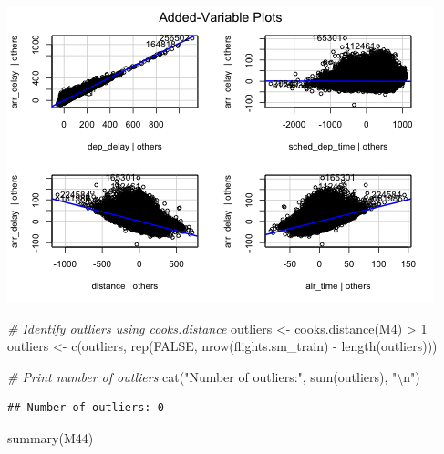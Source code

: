 \documentclass[
]{article}
\newenvironment{Shaded}{\begin{snugshade}}{\end{snugshade}}
\newcommand{\CommentTok}[1]{\textcolor[rgb]{0.56,0.35,0.01}{\textit{#1}}}
\newcommand{\ConstantTok}[1]{\textcolor[rgb]{0.00,0.00,0.00}{#1}}
\newcommand{\DecValTok}[1]{\textcolor[rgb]{0.00,0.00,0.81}{#1}}
\newcommand{\FunctionTok}[1]{\textcolor[rgb]{0.00,0.00,0.00}{#1}}
\newcommand{\NormalTok}[1]{#1}
\newcommand{\OtherTok}[1]{\textcolor[rgb]{0.56,0.35,0.01}{#1}}
\newcommand{\SpecialCharTok}[1]{\textcolor[rgb]{0.00,0.00,0.00}{#1}}
\newcommand{\StringTok}[1]{\textcolor[rgb]{0.31,0.60,0.02}{#1}}
\begin{document}
\includegraphics{HW3-Trinath-Sai-Subhash-Reddy-Pittala_files/figure-latex/unnamed-chunk-9-2.png}

\begin{Shaded}
\begin{Highlighting}[]
\CommentTok{\# Identify outliers using cooks.distance}
\NormalTok{outliers }\OtherTok{\textless{}{-}} \FunctionTok{cooks.distance}\NormalTok{(M4) }\SpecialCharTok{\textgreater{}} \DecValTok{1}
\NormalTok{outliers }\OtherTok{\textless{}{-}} \FunctionTok{c}\NormalTok{(outliers, }\FunctionTok{rep}\NormalTok{(}\ConstantTok{FALSE}\NormalTok{, }\FunctionTok{nrow}\NormalTok{(flights.sm\_train) }\SpecialCharTok{{-}} \FunctionTok{length}\NormalTok{(outliers)))}


\CommentTok{\# Print number of outliers}
\FunctionTok{cat}\NormalTok{(}\StringTok{"Number of outliers:"}\NormalTok{, }\FunctionTok{sum}\NormalTok{(outliers), }\StringTok{"}\SpecialCharTok{\textbackslash{}n}\StringTok{"}\NormalTok{)}
\end{Highlighting}
\end{Shaded}

\begin{verbatim}
## Number of outliers: 0
\end{verbatim}

\begin{Shaded}
\begin{Highlighting}[]
\FunctionTok{summary}\NormalTok{(M44)}
\end{Highlighting}
\end{Shaded}
\end{document}
